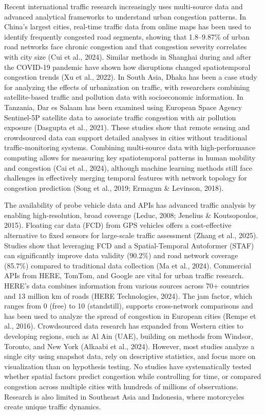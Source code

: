 \documentclass[12pt,a4paper]{article}
\begin{document}
Recent international traffic research increasingly uses multi-source data and advanced analytical frameworks to understand urban congestion patterns. In China’s largest cities, real-time traffic data from online maps has been used to identify frequently congested road segments, showing that 1.8–9.87\% of urban road networks face chronic congestion and that congestion severity correlates with city size (Cui et al., 2024). Similar methods in Shanghai during and after the COVID-19 pandemic have shown how disruptions changed spatiotemporal congestion trends (Xu et al., 2022). In South Asia, Dhaka has been a case study for analyzing the effects of urbanization on traffic, with researchers combining satellite-based traffic and pollution data with socioeconomic information. In Tanzania, Dar es Salaam has been examined using European Space Agency Sentinel-5P satellite data to associate traffic congestion with air pollution exposure (Dasgupta et al., 2021). These studies show that remote sensing and crowdsourced data can support detailed analyses in cities without traditional traffic-monitoring systems. Combining multi-source data with high-performance computing allows for measuring key spatiotemporal patterns in human mobility and congestion (Cai et al., 2024), although machine learning methods still face challenges in effectively merging temporal features with network topology for congestion prediction (Song et al., 2019; Ermagun \& Levinson, 2018).

The availability of probe vehicle data and APIs has advanced traffic analysis by enabling high-resolution, broad coverage (Leduc, 2008; Jenelius \& Koutsopoulos, 2015). Floating car data (FCD) from GPS vehicles offers a cost-effective alternative to fixed sensors for large-scale traffic assessment (Zhang et al., 2025). Studies show that leveraging FCD and a Spatial-Temporal Autoformer (STAF) can significantly improve data validity (90.2\%) and road network coverage (85.7\%) compared to traditional data collection (Ma et al., 2024). Commercial APIs from HERE, TomTom, and Google are vital for urban traffic research. HERE’s data combines information from various sources across 70+ countries and 13 million km of roads (HERE Technologies, 2024). The jam factor, which ranges from 0 (free) to 10 (standstill), supports cross-network comparisons and has been used to analyze the spread of congestion in European cities (Rempe et al., 2016). Crowdsourced data research has expanded from Western cities to developing regions, such as Al Ain (UAE), building on methods from Windsor, Toronto, and New York (Alkaabi et al., 2024). However, most studies analyze a single city using snapshot data, rely on descriptive statistics, and focus more on visualization than on hypothesis testing. No studies have systematically tested whether spatial factors predict congestion while controlling for time, or compared congestion across multiple cities with hundreds of millions of observations. Research is also limited in Southeast Asia and Indonesia, where motorcycles create unique traffic dynamics.
\end{document}
